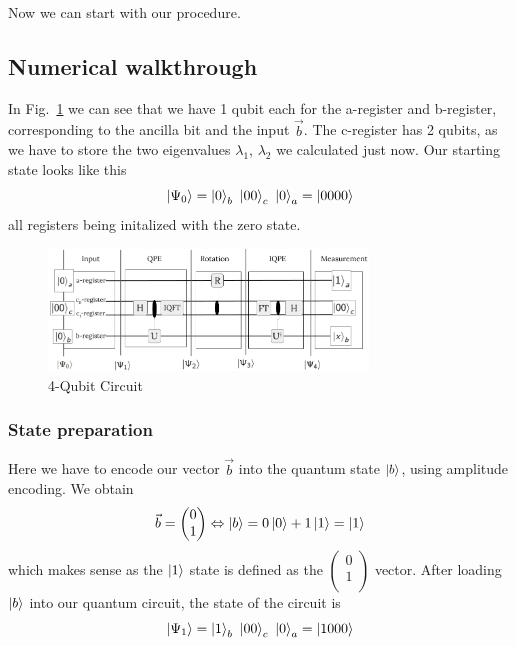 Now we can start with our procedure.

\subsection{Numerical walkthrough}

In Fig.~\ref{ex_circ_numerical} we can see that we have 1 qubit each for the a-register and b-register, corresponding to the ancilla bit and the input $\vec b$.
The c-register has 2 qubits, as we have to store the two eigenvalues $\lambda_1$, $\lambda_2$ we calculated just now.
Our starting state looks like this
\begin{equation}
\ket{\Psi_0} = \ket{0}_b\ \ket{00}_c\ \ket{0}_a = \ket{0000}
\end{equation}
all registers being initalized with the zero state.


\begin{figure}
    \centering
    \includegraphics[width=8.5cm]{img/example_circuit_4_qubit_cropped.png}
    \caption{4-Qubit Circuit}
    \label{ex_circ_numerical}
\end{figure}


\subsubsection{State preparation}
    Here we have to encode our vector $\vec{b}$ into the quantum state $\ket{b}$, using amplitude encoding.
    We obtain
    \begin{equation}
    \vec{b} = \begin{pmatrix} 0\\ 1\\ \end{pmatrix}
    \Leftrightarrow \ket{b} = 0 \ket{0} + 1 \ket{1} = \ket{1} 
    \end{equation}
    which makes sense as the $\ket 1$ state is defined as the $\begin{pmatrix} 0\\ 1\\ \end{pmatrix}$ vector.
    After loading $\ket b$ into our quantum circuit, the state of the circuit is 
    \begin{equation}
    \ket{\Psi_1} = \ket{1}_b\ \ket{00}_c\ \ket{0}_a = \ket{1000}
    \end{equation}

